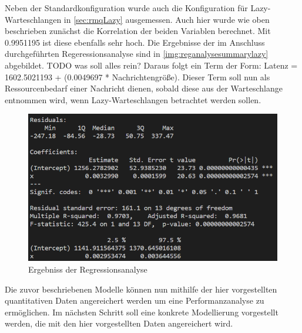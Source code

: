 Neben der Standardkonfiguration wurde auch die Konfiguration für Lazy-Warteschlangen in \autoref{sec:rmqLazy} ausgemessen. Auch hier wurde wie oben beschrieben zunächst die Korrelation der beiden Variablen berechnet. Mit 0.9951195 ist diese ebenfalls sehr hoch. Die Ergebnisse der im Anschluss durchgeführten Regeressionsanalyse sind in  \autoref{img:reganalysesummarylazy} abgebildet. TODO was soll alles rein?
Daraus folgt ein Term der Form: Latenz = 1602.5021193 + (0.0049697 * Nachrichtengröße). Dieser Term soll nun als Ressourcenbedarf einer Nachricht dienen, sobald diese aus der Warteschlange entnommen wird, wenn Lazy-Warteschlangen betrachtet werden sollen.
\begin{figure}
\center
  \includegraphics[width=1\textwidth]{images/modelling/reganalyse.png}
  \caption{Ergebniss der Regressionsanalyse}
  \label{img:reganalysesummarylazy}
\end{figure}

Die zuvor beschriebenen Modelle können nun mithilfe der hier vorgestellten quantitativen Daten angereichert werden um eine Performanzanalyse zu ermöglichen. Im nächsten Schritt soll eine konkrete Modellierung vorgestellt werden, die mit den hier vorgestellten Daten angereichert wird. 








